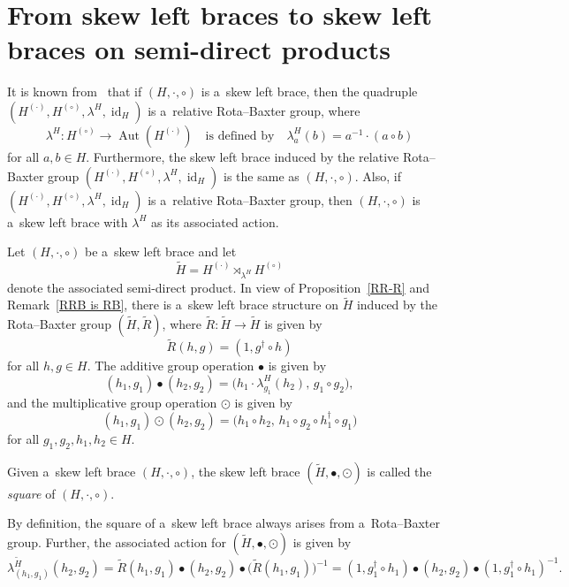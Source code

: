\documentclass{jonasart}
\theoremstyle{plain}
\DeclareMathOperator{\Aut}{Aut}
\DeclareMathOperator{\Id}{id}
\begin{document}
	\section{From skew left braces to skew left braces on semi-direct products}\label{section SLB to SLB on SDP}
	It is known from~\cite[Theorem 3.10]{MR4857550} that if $(H,\cdot,\circ)$ is a~skew left brace, then the quadruple $(H^{(\cdot)},H^{(\circ)},\lambda^H,\Id_H )$ is a~relative Rota--Baxter group, where
	\[
    \lambda^H: H^{(\circ)}\to \Aut(H^{(\cdot)})
    \quad \text{is defined by} \quad 
	\lambda^H_a(b)=a^{-1}\cdot(a\circ b)
	\]
	for all $a, b \in H$. Furthermore, the skew left brace induced by the relative Rota--Baxter group $(H^{(\cdot)},H^{(\circ)},\lambda^H,\Id_H )$ is the same as $(H, \cdot, \circ)$. Also, if $(H^{(\cdot)},H^{(\circ)},\lambda^H,\Id_H )$ is a~relative Rota--Baxter group, then $(H,\cdot,\circ)$ is a~skew left brace with $\lambda^H$ as its associated action.
	
	Let $(H,\cdot,\circ)$ be a~skew left brace and let
	\[
	\widetilde{H}=H^{(\cdot)} \rtimes_{\lambda^H} H^{(\circ)}
	\]
	denote the associated semi-direct product. In view of Proposition~\ref{RR-R} and Remark~\ref{RRB is RB}, there is a~skew left brace structure on $\widetilde{H}$ induced by the Rota--Baxter group $(\widetilde{H}, \widetilde{R})$, where
	$\widetilde{R}: \widetilde{H}\to \widetilde{H}$ is given by
	\begin{equation}\label{RB operator on semi-direct product}
		\widetilde{R} (h, g) = (1, g^\dagger\circ h)
	\end{equation}
	for all $h,g \in H$. The additive group operation $\bullet$ is given by
	\[
	(h_1, g_1)\bullet (h_2, g_2) = \big(h_1\cdot \lambda^H_{g_1}(h_2), \, g_1\circ g_2 \big),
	\]
	and the multiplicative group operation $\odot$ is given by
	\[
	(h_1, g_1)\odot  (h_2, g_2) = \big(h_1\circ h_2,  \, h_1\circ g_2\circ h_1^\dagger \circ g_1 \big)
	\]
	for all $g_1, g_2, h_1, h_2 \in H$.
	
	\begin{definition}
		Given a~skew left brace $(H,\cdot,\circ)$, the skew left brace $(\widetilde{H}, \bullet, \odot)$ is called the \textit{square} of $(H,\cdot,\circ)$.
	\end{definition}
	
	\begin{remark}\label{rem square arise from RBG}
		By definition, the square of a~skew left brace always arises from a~Rota--Baxter group. Further, the associated action for $(\widetilde{H}, \bullet, \odot)$ is given by
		\[
		\lambda^{\widetilde{H}}_{(h_1, g_1)}(h_2, g_2) = \widetilde{R} (h_1, g_1) \bullet (h_2, g_2) \bullet \big(\widetilde{R} (h_1, g_1)\big)^{-1}=  (1, g_1^\dagger\circ h_1) \bullet (h_2, g_2)  \bullet  (1, g_1^\dagger\circ h_1)^{-1}.
		\]
	\end{remark}
	
\end{document}
